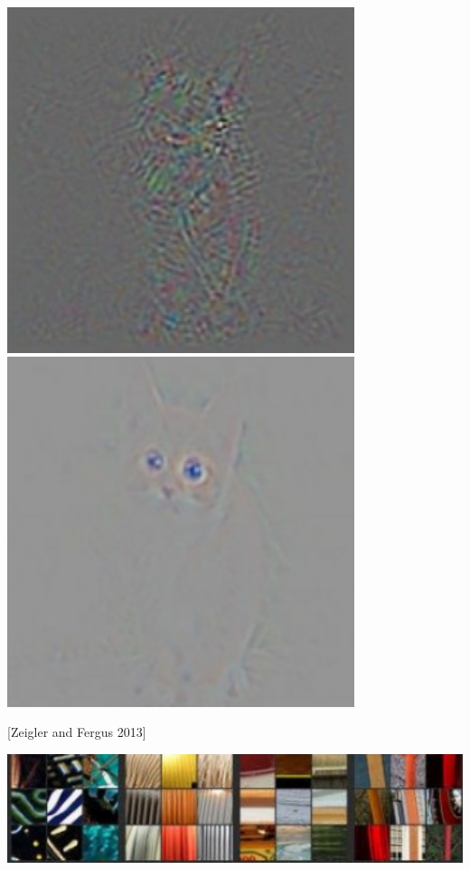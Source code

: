 {\centerline{\includegraphics[width = 4in]{../images/DeconvUnguided} \hfill \includegraphics[width=4in]{../images/DeconvGuided}}

\centerline{[Zeigler and Fergus 2013]}



\centerline{\includegraphics[width = 8in]{../images/Deconv2IM}}

}
